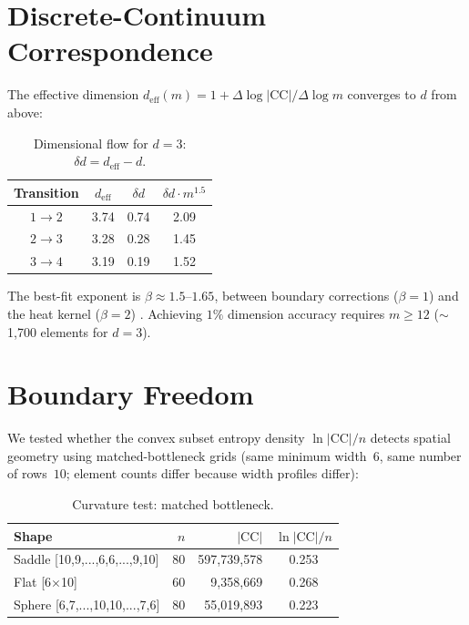 \documentclass[aps,prl,twocolumn,superscriptaddress]{revtex4-2}
\begin{document}
\section{Discrete-Continuum Correspondence}
\label{sec:continuum}

The effective dimension
$d_{\mathrm{eff}}(m) = 1 + \Delta\log|\mathrm{CC}|/\Delta\log m$
converges to $d$ from above:

\begin{table}[h]
\caption{Dimensional flow for $d=3$: $\delta d = d_{\mathrm{eff}}-d$.}
\label{tab:flow}
\begin{ruledtabular}
\begin{tabular}{cccc}
Transition & $d_{\mathrm{eff}}$ & $\delta d$ & $\delta d \cdot m^{1.5}$ \\
\midrule
$1 \to 2$ & 3.74 & 0.74 & 2.09 \\
$2 \to 3$ & 3.28 & 0.28 & 1.45 \\
$3 \to 4$ & 3.19 & 0.19 & 1.52 \\
\end{tabular}
\end{ruledtabular}
\end{table}

The best-fit exponent is $\beta \approx 1.5$--$1.65$, between
boundary corrections ($\beta = 1$) and the heat kernel ($\beta = 2$)
\cite{Gilkey1975}. Achieving $1\%$ dimension accuracy requires
$m \geq 12$ ($\sim$1,700 elements for $d=3$).

\section{Boundary Freedom}

We tested whether the convex subset entropy density
$\ln|\mathrm{CC}|/n$ detects spatial geometry using
matched-bottleneck grids (same minimum width~$6$, same number of
rows~$10$; element counts differ because width profiles differ):

\begin{table}[h]
\caption{Curvature test: matched bottleneck.}
\label{tab:curvature}
\begin{ruledtabular}
\begin{tabular}{lrrc}
Shape & $n$ & $|\mathrm{CC}|$ & $\ln|\mathrm{CC}|/n$ \\
\midrule
Saddle [10,9,...,6,6,...,9,10] & 80 & 597{,}739{,}578 & 0.253 \\
Flat [6$\times$10] & 60 & 9{,}358{,}669 & 0.268 \\
Sphere [6,7,...,10,10,...,7,6] & 80 & 55{,}019{,}893 & 0.223 \\
\end{tabular}
\end{ruledtabular}
\end{table}
\end{document}

